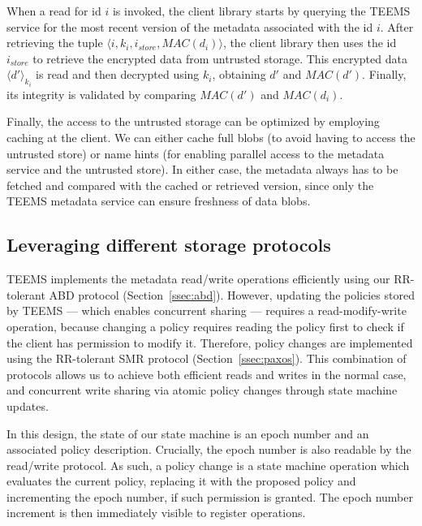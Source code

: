 When a read for id $i$ is invoked, the client library starts by
querying the \ac{TEEMS} service for the most recent version of
the metadata associated with the id $i$. After retrieving the
tuple $\langle i,k_i,i_{store},MAC(d_i) \rangle$, the client
library then uses the id $i_{store}$ to retrieve the encrypted
data from untrusted storage. This encrypted data $\langle
d'\rangle_{k_i}$ is read and then decrypted using $k_i$,
obtaining $d'$ and $MAC(d')$. Finally, its integrity  is
validated by comparing $MAC(d')$ and $MAC(d_i)$.

Finally, the access to the untrusted storage can be optimized by
employing caching at the client. We can either cache full blobs (to
avoid having to access the untrusted store) or name hints (for
enabling parallel access to the metadata service and the untrusted
store).  In either case, the metadata always has to be fetched and
compared with the cached or retrieved version, since only the
\ac{TEEMS} metadata service can ensure freshness of data blobs.

\subsection{Leveraging different storage protocols}

\ac{TEEMS} implements the metadata read/write operations efficiently using
our \ac{RR}-tolerant ABD protocol (Section~\ref{ssec:abd}).  However,
updating the policies stored by \ac{TEEMS} --- which enables concurrent
 sharing --- requires a read-modify-write operation, because changing
a policy requires reading the policy first to check if the client has
permission to modify it.  Therefore, policy changes are implemented
using the \ac{RR}-tolerant SMR protocol
(Section~\ref{ssec:paxos}).  This combination of protocols allows us
to achieve both efficient reads and writes in the normal case, and
concurrent write sharing via atomic policy changes through state
machine updates.

In this design, the state of our state machine is an epoch number
and an associated policy description. Crucially, the
epoch number is also readable by the read/write protocol. As
such, a policy change is a state machine operation which
evaluates the current policy, replacing it with the proposed
policy and incrementing the epoch number, if such permission is
granted. The epoch number increment is then immediately
visible to register operations.




